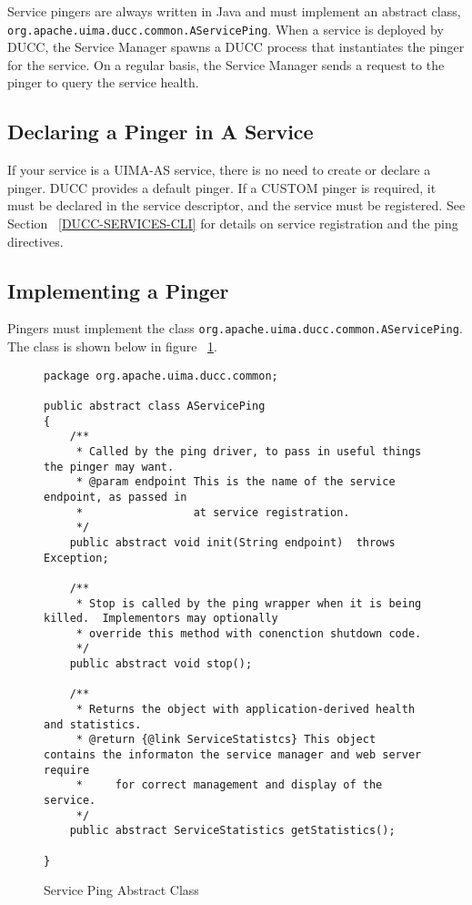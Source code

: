       Service pingers are always written in Java and must implement an abstract class,
      {\tt org.apache.uima.ducc.common.AServicePing}.   When a service is deployed by
      DUCC, the Service Manager spawns a DUCC process that instantiates the pinger for
      the service.  On a regular basis, the Service Manager sends a request to the pinger
      to query the service health.

      \subsection{Declaring a Pinger in A Service}

      If your service is a UIMA-AS service, there is no need to create or declare a pinger.  DUCC
      provides a default pinger.  If a CUSTOM pinger is required, it must be declared in the service
      descriptor, and the service must be registered.  See Section ~\ref{DUCC-SERVICES-CLI} for
      details on service registration and the ping directives.      

      \subsection{Implementing a Pinger}
      Pingers must implement the class {\tt org.apache.uima.ducc.common.AServicePing}.  The class
      is shown below in figure ~\ref{ABSTRACT-PINGER}.
      \begin{figure}[H]
\begin{verbatim}
package org.apache.uima.ducc.common;

public abstract class AServicePing
{
    /**
     * Called by the ping driver, to pass in useful things the pinger may want.
     * @param endpoint This is the name of the service endpoint, as passed in
     *                 at service registration.
     */
    public abstract void init(String endpoint)  throws Exception;

    /**
     * Stop is called by the ping wrapper when it is being killed.  Implementors may optionally
     * override this method with conenction shutdown code.
     */
    public abstract void stop();

    /**
     * Returns the object with application-derived health and statistics.
     * @return {@link ServiceStatistcs} This object contains the informaton the service manager and web server require
     *     for correct management and display of the service.
     */
    public abstract ServiceStatistics getStatistics();
    
}
\end{verbatim}
        \caption{} Service Ping Abstract Class
        \label{ABSTRACT-PINGER}

      \end{figure}
      
